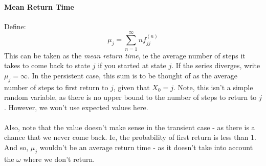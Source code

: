 \documentclass[12pt,a4paper]{article}
\newcommand{\1}[1]{\mathbbm{1}\left\{ #1 \right\}}
\begin{document}
\paragraph{Mean Return Time} Define:
$$
	\mu_j = \sum_{n=1}^\infty nf_{jj}^{(n)}
$$
This can be taken as the \textit{mean return time}, ie the average number of steps it takes to come back to state $j$ if you started at state $j$. If the series diverges, write $\mu_j = \infty$. In the persistent case, this sum is to be thought of as the average number of steps to first return to $j$, given that $X_0 = j$. Note, this isn't a simple random variable, as there is no upper bound to the number of steps to return to $j$. However, we won't use expected values here.
\\\\
Also, note that the value doesn't make sense in the transient case - as there is a chance that we never come back. Ie, the probability of first return is less than $1$. And so, $\mu_j$ wouldn't be an average return time - as it doesn't take into account the $\omega$ where we don't return.
\end{document}
